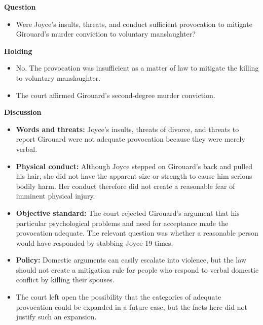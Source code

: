 \documentclass[11pt]{tex/lawoutline}
\begin{document}
{        \textbf{Question}
        \begin{itemize}
            \item Were Joyce's insults, threats, and conduct sufficient provocation to mitigate Girouard's murder conviction to voluntary manslaughter?
        \end{itemize}

        \textbf{Holding}
        \begin{itemize}
            \item No. The provocation was insufficient as a matter of law to mitigate the killing to voluntary manslaughter.
            \item The court affirmed Girouard's second-degree murder conviction.
        \end{itemize}

        \textbf{Discussion}
        \begin{itemize}
            \item \textbf{Words and threats:} Joyce's insults, threats of divorce, and threats to report Girouard were not adequate provocation because they were merely verbal.
            \item \textbf{Physical conduct:} Although Joyce stepped on Girouard's back and pulled his hair, she did not have the apparent size or strength to cause him serious bodily harm. Her conduct therefore did not create a reasonable fear of imminent physical injury.
            \item \textbf{Objective standard:} The court rejected Girouard's argument that his particular psychological problems and need for acceptance made the provocation adequate. The relevant question was whether a reasonable person would have responded by stabbing Joyce 19 times.
            \item \textbf{Policy:} Domestic arguments can easily escalate into violence, but the law should not create a mitigation rule for people who respond to verbal domestic conflict by killing their spouses.
            \item The court left open the possibility that the categories of adequate provocation could be expanded in a future case, but the facts here did not justify such an expansion.
        \end{itemize}
    }
\end{document}
